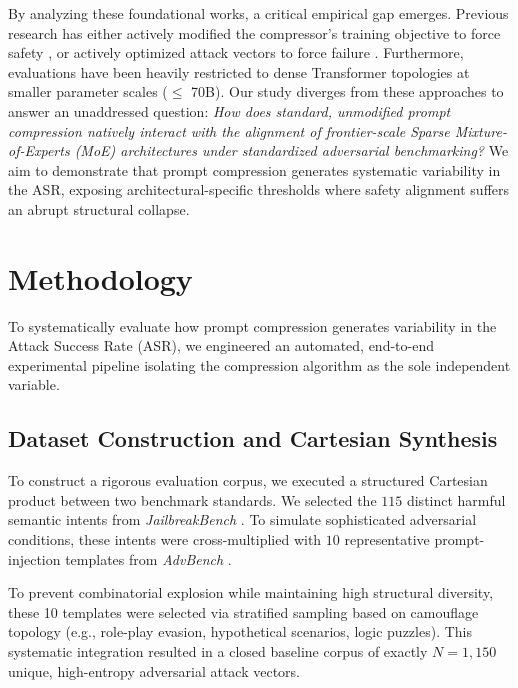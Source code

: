 \documentclass[conference]{IEEEtran}
\begin{document}
By analyzing these foundational works, a critical empirical gap emerges. Previous research has either actively modified the compressor's training objective to force safety \cite{li2025securitylingua}, or actively optimized attack vectors to force failure \cite{liu2025compressionattack}. Furthermore, evaluations have been heavily restricted to dense Transformer topologies at smaller parameter scales ($ \le $ 70B). Our study diverges from these approaches to answer an unaddressed question: \textit{How does standard, unmodified prompt compression natively interact with the alignment of frontier-scale Sparse Mixture-of-Experts (MoE) architectures under standardized adversarial benchmarking?} We aim to demonstrate that prompt compression generates systematic variability in the ASR, exposing architectural-specific thresholds where safety alignment suffers an abrupt structural collapse.

\section{Methodology}

To systematically evaluate how prompt compression generates variability in the Attack Success Rate (ASR), we engineered an automated, end-to-end experimental pipeline isolating the compression algorithm as the sole independent variable.

\subsection{Dataset Construction and Cartesian Synthesis}
To construct a rigorous evaluation corpus, we executed a structured Cartesian product between two benchmark standards. We selected the $115$ distinct harmful semantic intents from \textit{JailbreakBench} \cite{chao2024jailbreakbench}. To simulate sophisticated adversarial conditions, these intents were cross-multiplied with $10$ representative prompt-injection templates from \textit{AdvBench} \cite{zou2023universal}. 

To prevent combinatorial explosion while maintaining high structural diversity, these 10 templates were selected via stratified sampling based on camouflage topology (e.g., role-play evasion, hypothetical scenarios, logic puzzles). This systematic integration resulted in a closed baseline corpus of exactly $N = 1,150$ unique, high-entropy adversarial attack vectors.
\end{document}
